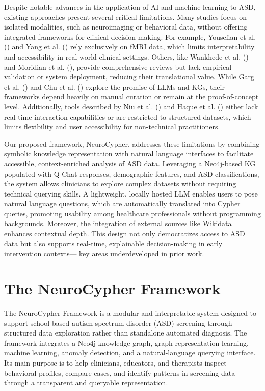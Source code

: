 \documentclass[pdflatex,sn-basic]{sn-jnl}%
\theoremstyle{thmstyleone}%
\theoremstyle{thmstyletwo}%
\theoremstyle{thmstylethree}%
\begin{document}
  Despite notable advances in the application of AI and machine learning to ASD, existing approaches present several critical
  limitations. Many studies focus on isolated modalities, such as neuroimaging or behavioral data, without offering integrated
  frameworks for clinical decision-making. For example, Yousefian et al. (\cite{yousefian_detection_2023}) and Yang et al.
  (\cite{yang_autism_2021}) rely exclusively on fMRI data, which limits interpretability and accessibility in real-world clinical
  settings. Others, like Wankhede et al. (\cite{wankhede_leveraging_2024}) and Moridian et al. (\cite{moridian_automatic_2022}),
  provide comprehensive reviews but lack empirical validation or system deployment, reducing their translational value. While
  Garg et al. (\cite{garg_insights_2024}) and Chu et al. (\cite{chu_chatasd_2024}) explore the promise of LLMs and KGs, their
  frameworks depend heavily on manual curation or remain at the proof-of-concept level. Additionally, tools described by Niu et
  al. (\cite{niu_intelligent_2024}) and Haque et al. (\cite{haque_exploration_2025}) either lack real-time interaction
  capabilities or are restricted to structured datasets, which limits flexibility and user accessibility for non-technical
  practitioners.

  Our proposed framework, NeuroCypher, addresses these limitations by combining symbolic knowledge representation with natural
  language interfaces to facilitate accessible, context-enriched analysis of ASD data. Leveraging a Neo4j-based KG populated with
  Q-Chat responses, demographic features, and ASD classifications, the system allows clinicians to explore complex datasets
  without requiring technical querying skills. A lightweight, locally hosted LLM enables users to pose natural language
  questions, which are automatically translated into Cypher queries, promoting usability among healthcare professionals without
  programming backgrounds. Moreover, the integration of external sources like Wikidata enhances contextual depth. This design not
  only democratizes access to ASD data but also supports real-time, explainable decision-making in early intervention contexts—
  key areas underdeveloped in prior work.

\section{The NeuroCypher Framework}\label{sec11}

The NeuroCypher Framework is a modular and interpretable system designed to support school-based autism spectrum disorder (ASD) screening through structured data exploration rather than standalone automated diagnosis. The framework integrates a Neo4j knowledge graph, graph representation learning, machine learning, anomaly detection, and a natural-language querying interface. Its main purpose is to help clinicians, educators, and therapists inspect behavioral profiles, compare cases, and identify patterns in screening data through a transparent and queryable representation.
\end{document}
